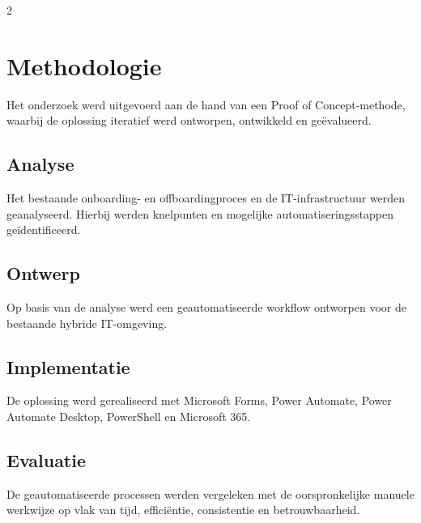 \documentclass[a0,portrait]{hogent-poster}
\begin{document}
\begin{multicols}{2}
\section{Methodologie}

Het onderzoek werd uitgevoerd aan de hand van een Proof of Concept-methode,
waarbij de oplossing iteratief werd ontworpen, ontwikkeld en geëvalueerd.

\subsection{Analyse}
Het bestaande onboarding- en offboardingproces en de IT-infrastructuur
werden geanalyseerd. Hierbij werden knelpunten en mogelijke
automatiseringsstappen geïdentificeerd.

\subsection{Ontwerp}
Op basis van de analyse werd een geautomatiseerde workflow ontworpen
voor de bestaande hybride IT-omgeving.

\subsection{Implementatie}
De oplossing werd gerealiseerd met Microsoft Forms, Power Automate,
Power Automate Desktop, PowerShell en Microsoft 365.

\subsection{Evaluatie}
De geautomatiseerde processen werden vergeleken met de oorspronkelijke
manuele werkwijze op vlak van tijd, efficiëntie, consistentie en
betrouwbaarheid.




\end{multicols}
\end{document}

